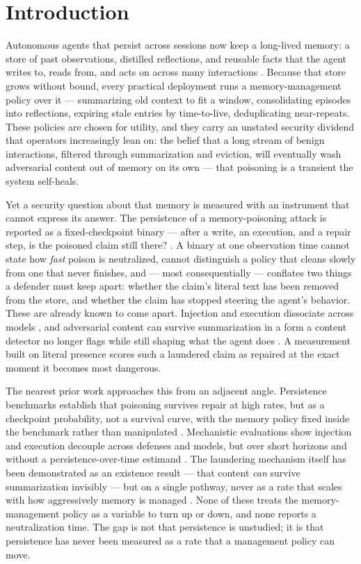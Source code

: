 \documentclass[11pt]{article}
\begin{document}
\section{Introduction}

Autonomous agents that persist across sessions now keep a long-lived memory: a store of past observations, distilled reflections, and reusable facts that the agent writes to, reads from, and acts on across many interactions \citep{packer2023memgpt,park2023generative}. Because that store grows without bound, every practical deployment runs a memory-management policy over it --- summarizing old context to fit a window, consolidating episodes into reflections, expiring stale entries by time-to-live, deduplicating near-repeats. These policies are chosen for utility, and they carry an unstated security dividend that operators increasingly lean on: the belief that a long stream of benign interactions, filtered through summarization and eviction, will eventually wash adversarial content out of memory on its own --- that poisoning is a transient the system self-heals.

Yet a security question about that memory is measured with an instrument that cannot express its answer. The persistence of a memory-poisoning attack is reported as a fixed-checkpoint binary --- after a write, an execution, and a repair step, is the poisoned claim still there? \citep{chen2026memsecbench}. A binary at one observation time cannot state how \emph{fast} poison is neutralized, cannot distinguish a policy that cleans slowly from one that never finishes, and --- most consequentially --- conflates two things a defender must keep apart: whether the claim's literal text has been removed from the store, and whether the claim has stopped steering the agent's behavior. These are already known to come apart. Injection and execution dissociate across models \citep{leong2026injexec}, and adversarial content can survive summarization in a form a content detector no longer flags while still shaping what the agent does \citep{wang2026statecontam}. A measurement built on literal presence scores such a laundered claim as repaired at the exact moment it becomes most dangerous.

The nearest prior work approaches this from an adjacent angle. Persistence benchmarks establish that poisoning survives repair at high rates, but as a checkpoint probability, not a survival curve, with the memory policy fixed inside the benchmark rather than manipulated \citep{chen2026memsecbench}. Mechanistic evaluations show injection and execution decouple across defenses and models, but over short horizons and without a persistence-over-time estimand \citep{leong2026injexec}. The laundering mechanism itself has been demonstrated as an existence result --- that content \emph{can} survive summarization invisibly --- but on a single pathway, never as a rate that scales with how aggressively memory is managed \citep{wang2026statecontam}. None of these treats the memory-management policy as a variable to turn up or down, and none reports a neutralization time. The gap is not that persistence is unstudied; it is that persistence has never been measured as a rate that a management policy can move.
\end{document}

